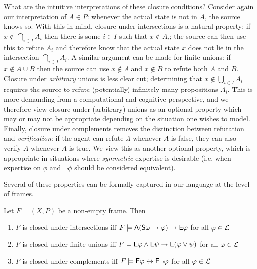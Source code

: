 What are the intuitive interpretations of these closure conditions? Consider
again our interpretation of $A \in P$: whenever the actual state is not in $A$,
the source knows so. With this in mind, closure under intersections is a
natural property: if $x \notin \bigcap_{i \in I}{A_i}$ then there is some $i
\in I$ such that $x \notin A_i$; the source can then use this to refute $A_i$
and therefore know that the actual state $x$ does not lie in the intersection
$\bigcap_{i \in I}{A_i}$. A similar argument can be made for finite unions: if
$x \notin A \cup B$ then the source can use $x \notin A$ and $x \notin B$ to
refute both $A$ and $B$. Closure under \emph{arbitrary} unions is less clear
cut; determining that $x \notin \bigcup_{i \in I}{A_i}$ requires the source to
refute (potentially) infinitely many propositions $A_i$.  This is more
demanding from a computational and cognitive perspective, and we therefore view
closure under (arbitrary) unions as an optional property which may or may not
be appropriate depending on the situation one wishes to model. Finally,
closure under complements removes the distinction between refutation and
\emph{verification}: if the agent can refute $A$ whenever $A$ is false, they
can also verify $A$ whenever $A$ is true. We view this as another optional
property, which is appropriate in situations where \emph{symmetric} expertise
is desirable (i.e. when expertise on $\phi$ and $\neg\phi$ should be considered
equivalent).

Several of these properties can be formally captured in our language at the
level of frames.

\begin{proposition}
\label{exp_prop_frame_conditions}

    Let $F = (X, P)$ be a non-empty frame. Then

    \begin{enumerate}

        \item\label{exp_item_frame_condition_intersections} $F$ is closed under
            intersections iff $F \models \mathsf{A}(\mathsf{S}\varphi \to \varphi) \to
            \mathsf{E}\varphi$ for all $\varphi \in \mathcal{L}$

        \item\label{exp_item_frame_condition_finunions} $F$ is closed under finite
            unions iff $F \models \mathsf{E}\varphi \land \mathsf{E}\psi \to \mathsf{E}(\varphi \lor
            \psi)$ for all $\varphi \in \mathcal{L}$

        \item\label{exp_item_frame_condition_compl} $F$ is closed under complements
            iff $F \models \mathsf{E}\varphi \leftrightarrow \mathsf{E}\neg\varphi$ for all $\varphi \in \mathcal{L}$

    \end{enumerate}
\end{proposition}


